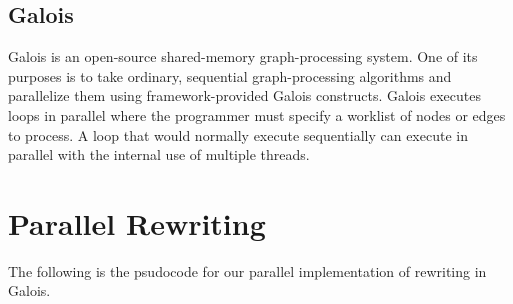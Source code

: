 \documentclass[twocolumn]{article}
\begin{document}
\subsection{Galois}
Galois is an open-source shared-memory graph-processing system\cite{GALOIS}.  One of its purposes is to take ordinary, sequential graph-processing algorithms and parallelize them using framework-provided Galois constructs.\newline\indent
Galois executes loops in parallel where the programmer must specify a worklist of nodes or edges to process.  A loop that would normally execute sequentially can execute in parallel with the internal use of multiple threads.
\section{Parallel Rewriting}
The following is the psudocode for our parallel implementation of rewriting in Galois.


\end{document}
